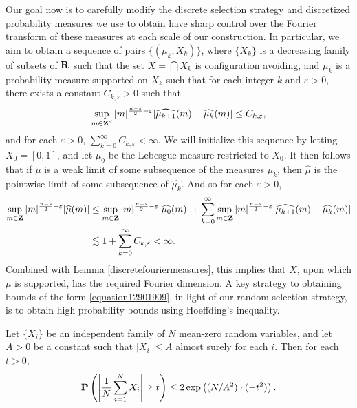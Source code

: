 Our goal now is to carefully modify the discrete selection strategy and discretized probability measures we use to obtain have sharp control over the Fourier transform of these measures at each scale of our construction. In particular, we aim to obtain a sequence of pairs $\{ (\mu_k, X_k) \}$, where $\{ X_k \}$ is a decreasing family of subsets of $\operatorname{\mathbf{R}}$ such that the set $X = \bigcap X_k$ is configuration avoiding, and $\mu_k$ is a probability measure supported on $X_k$ such that for each integer $k$ and $\varepsilon > 0$, there exists a constant $C_{k,\varepsilon} > 0$ such that
%
\begin{equation} \label{equation12901909}
    \sup_{m \in \operatorname{\mathbf{Z}}^d} |m|^{\frac{n - s}{2} - \varepsilon} |\widehat{\mu_{k+1}}(m) - \widehat{\mu_k}(m)| \leq C_{k,\varepsilon},
\end{equation}
%
and for each $\varepsilon > 0$, $\sum_{k = 0}^\infty C_{k,\varepsilon} < \infty$. We will initialize this sequence by letting $X_0 = [0,1]$, and let $\mu_0$ be the Lebesgue measure restricted to $X_0$. It then follows that if $\mu$ is a weak limit of some subsequence of the measures $\mu_k$, then $\widehat{\mu}$ is the pointwise limit of some subsequence of $\widehat{\mu_k}$. And so for each $\varepsilon > 0$,
%
\begin{align*}
    \sup_{m \in \operatorname{\mathbf{Z}}} |m|^{\frac{n-s}{2} - \varepsilon} |\widehat{\mu}(m)| &\leq \sup_{m \in \operatorname{\mathbf{Z}}} |m|^{\frac{n-s}{2} - \varepsilon} |\widehat{\mu_0}(m)| + \sum_{k = 0}^\infty \sup_{m \in \operatorname{\mathbf{Z}}} |m|^{\frac{n-s}{2} - \varepsilon} |\widehat{\mu_{k+1}}(m) - \widehat{\mu_k}(m)|\\
    &\lesssim 1 + \sum_{k = 0}^\infty C_{k,\varepsilon} < \infty.
\end{align*}
%
Combined with Lemma \ref{discretefouriermeasures}, this implies that $X$, upon which $\mu$ is supported, has the required Fourier dimension. A key strategy to obtaining bounds of the form \eqref{equation12901909}, in light of our random selection strategy, is to obtain high probability bounds using Hoeffding's inequality.

\begin{theorem}
    Let $\{ X_i \}$ be an independent family of $N$ mean-zero random variables, and let $A > 0$ be a constant such that $|X_i| \leq A$ almost surely for each $i$. Then for each $t > 0$,
    \[ \operatorname{\mathbf{P}} \left( \left| \frac{1}{N} \sum_{i = 1}^N X_i \right| \geq t \right) \leq 2 \exp \left( (N/A^2) \cdot (- t^2) \right). \]
\end{theorem}


